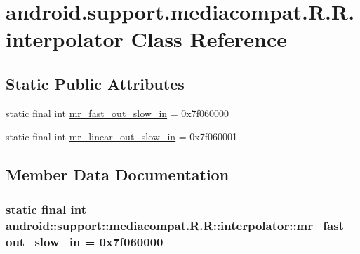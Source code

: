 \hypertarget{classandroid_1_1support_1_1mediacompat_1_1_r_1_1interpolator}{
\section{android.support.mediacompat.R.R.interpolator Class Reference}
\label{classandroid_1_1support_1_1mediacompat_1_1_r_1_1interpolator}
}
\subsection*{Static Public Attributes}
\begin{CompactItemize}
\item 
static final int \hyperlink{classandroid_1_1support_1_1mediacompat_1_1_r_1_1interpolator_960e632c7f8065736052e9cebe9fc39b}{mr\_\-fast\_\-out\_\-slow\_\-in} = 0x7f060000
\item 
static final int \hyperlink{classandroid_1_1support_1_1mediacompat_1_1_r_1_1interpolator_2b0cc78672a3c7f98e294f04f7713008}{mr\_\-linear\_\-out\_\-slow\_\-in} = 0x7f060001
\end{CompactItemize}


\subsection{Member Data Documentation}
\hypertarget{classandroid_1_1support_1_1mediacompat_1_1_r_1_1interpolator_960e632c7f8065736052e9cebe9fc39b}{
\subsubsection[{mr\_\-fast\_\-out\_\-slow\_\-in}]{\setlength{\rightskip}{0pt plus 5cm}static final int android::support::mediacompat.R.R::interpolator::mr\_\-fast\_\-out\_\-slow\_\-in = 0x7f060000}}
\label{classandroid_1_1support_1_1mediacompat_1_1_r_1_1interpolator_960e632c7f8065736052e9cebe9fc39b}


